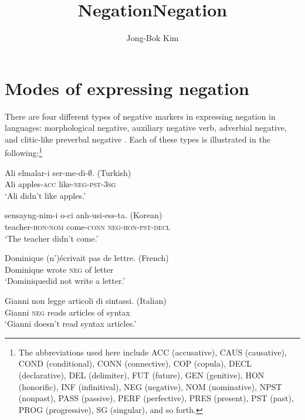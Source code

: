 \documentclass[output=paper
                ,modfonts
                		,nonflat
	        ,collection
	        ,collectionchapter
	        ,collectiontoclongg
 	        ,biblatex
                ,babelshorthands
                ,newtxmath
                ,draftmode
                ,colorlinks, citecolor=brown
]{./langsci/langscibook}
\author{Jong-Bok Kim\affiliation{Kyung Hee University, Seoul}}
\title{Negation}
\title{Negation}
\begin{document}
\maketitle

{

\section{Modes of expressing negation}


There are four different types of negative markers
in expressing negation in languages: morphological negative,
auxiliary negative verb, adverbial negative, and clitic-like
 preverbal negative \citep[see]{Dahl:79, Payne:85, Dryer:05}.
Each of these types is illustrated in the following:\footnote{The abbreviations
used here include ACC (accusative), CAUS (causative), COND (conditional), CONN (connective), COP (copula),  DECL (declarative), DEL (delimiter), FUT (future), GEN (genitive), HON (honorific), INF (infinitival), NEG (negative), NOM (nominative), NPST (nonpast), PASS (passive), PERF (perfective), PRES (present), PST (past),   PROG (progressive),  SG (singular), and so forth.}

\eal
\ex\label{1a}
\gll Ali  elmalar-i  ser-me-di-$\emptyset$. \hfill (Turkish) \\
Ali apples-\textsc{acc}  like-\textsc{neg}-\textsc{pst}-\textsc{3sg} \\
\glt `Ali didn't like apples.'

\ex\label{1b}
\gll sensayng-nim-i o-ci anh-usi-ess-ta.  \hfill (Korean) \\
teacher-\textsc{hon}-\textsc{nom} come-\textsc{conn} \textsc{neg}-\textsc{hon}-\textsc{pst}-\textsc{decl} \\
\glt `The teacher didn't come.'

\ex \label{1c}
\gll Dominique (n')\'{e}crivait pas de lettre. \hfill (French)\\
     Dominique wrote \textsc{neg} of letter \\
\glt `Dominiquedid not write a letter.'

\ex \label{1d} %
\gll Gianni non legge articoli di sintassi. \hfil (Italian) \\
Gianni \textsc{neg} reads articles of syntax \\
\glt `Gianni doesn't read syntax articles.'
\zl

}
\end{document}
